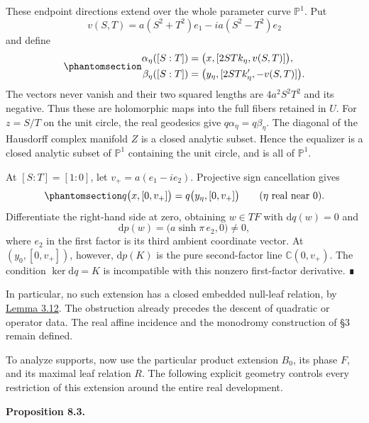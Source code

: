 \documentclass[
  english,
  11pt,
  reqno]{amsart}
\makeatletter
\newcommand{\pandocstatementheading}[1]{%
  \par\addpenalty{\@beginparpenalty}%
  \addvspace{.5\baselineskip plus .2\baselineskip minus .2\baselineskip}%
  {\normalfont\bfseries #1\par}%
  \nobreak\@afterindenttrue\@afterheading
}
\makeatother
\begin{document}
These endpoint directions extend over the whole parameter curve
\(\mathbb P^1\). Put \[
v(S,T)=a(S^2+T^2)e_1-ia(S^2-T^2)e_2
\] and define
\begin{equation}\protect\phantomsection\label{eq:nariai-compact-direction-conics}{
\begin{aligned}
\alpha_\eta([S:T])&=
 \bigl(x,[2STk_\eta,v(S,T)]\bigr),\\
\beta_\eta([S:T])&=
 \bigl(y_\eta,[2STk_\eta',-v(S,T)]\bigr).
\end{aligned}
}\end{equation} The vectors never vanish and their two squared lengths
are \(4a^2S^2T^2\) and its negative. Thus these are holomorphic maps
into the full fibers retained in \(U\). For \(z=S/T\) on the unit
circle, the real geodesics give \(q\alpha_\eta=q\beta_\eta\). The
diagonal of the Hausdorff complex manifold \(Z\) is a closed analytic
subset. Hence the equalizer is a closed analytic subset of
\(\mathbb P^1\) containing the unit circle, and is all of
\(\mathbb P^1\).

At \([S:T]=[1:0]\), let \(v_+=a(e_1-ie_2)\). Projective sign
cancellation gives
\begin{equation}\protect\phantomsection\label{eq:nariai-forced-degenerate-ray-equality}{
q\bigl(x,[0,v_+]\bigr)
=q\bigl(y_\eta,[0,v_+]\bigr)
\qquad(\eta\text{ real near }0).
}\end{equation} Differentiate the right-hand side at zero, obtaining
\(w\in TF\) with \(\mathrm dq(w)=0\) and \[
\mathrm dp(w)=\bigl(a\sinh\pi\,e_2,0\bigr)\ne0,
\] where \(e_2\) in the first factor is its third ambient coordinate
vector. At \((y_0,[0,v_+])\), however, \(\mathrm dp(K)\) is the pure
second-factor line \(\mathbb C(0,v_+)\). The condition
\(\ker\mathrm dq=K\) is incompatible with this nonzero first-factor
derivative. ∎

In particular, no such extension has a closed embedded null-leaf
relation, by \hyperref[lem:ordinary-null-quotient-v08]{Lemma 3.12}. The
obstruction already precedes the descent of quadratic or operator data.
The real affine incidence and the monodromy construction of §3 remain
defined.

To analyze supports, now use the particular product extension \(B_0\),
its phase \(F\), and its maximal leaf relation \(R\). The following
explicit geometry controls every restriction of this extension around
the entire real development.

\pandocstatementheading{\protect{}\label{prop:nariai-proper-leaves-nonclosed-relation}Proposition 8.3.}
\end{document}
